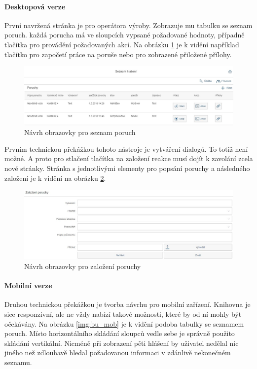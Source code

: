 \documentclass[thesis=M,czech]{FITthesis}[2012/06/26]
\begin{document}
\paragraph{Desktopová verze}
První navržená stránka je pro operátora výroby. Zobrazuje mu tabulku se seznam poruch. každá porucha má ve sloupcích vypsané požadované hodnoty, případně tlačítka pro provádění požadovaných akcí. Na obrázku \ref{img:bu_poruchy_seznam} je k vidění například tlačítko pro započetí práce na poruše nebo pro zobrazené přiložené přílohy. 
\begin{figure}[H]
	\centering
	\includegraphics[width=1\textwidth]{images/bu_poruchy_seznam}
	\caption{Návrh obrazovky pro seznam poruch}
	\label{img:bu_poruchy_seznam}
\end{figure}
Prvním technickou překážkou tohoto nástroje je vytváření dialogů. To totiž není možné. A proto pro stlačení tlačítka na založení reakce musí dojít k zavolání zcela nové stránky. Stránka s jednotlivými elementy pro popsání poruchy a následného založení je k vidění na obrázku \ref{img:bu_zalozeni_poruchy}. 
\begin{figure}[H]
	\centering
	\includegraphics[width=1\textwidth]{images/bu_zalozeni_poruchy}
	\caption{Návrh obrazovky pro založení poruchy}
	\label{img:bu_zalozeni_poruchy}
\end{figure}

\paragraph{Mobilní verze}
Druhou technickou překážkou je tvorba návrhu pro mobilní zařízení. Knihovna  je sice responzivní, ale ne vždy nabízí takové možnosti, které by od ní mohly být očekávány. Na obrázku \ref{img:bu_mob} je k vidění podoba tabulky se seznamem poruch. Místo horizontálního skládání sloupců vedle sebe je správně použito skládání vertikální. Nicméně při zobrazení pěti hlášení by uživatel nedělal nic jiného než zdlouhavě hledal požadovanou informaci v zdánlivě nekonečném seznamu.
\end{document}
